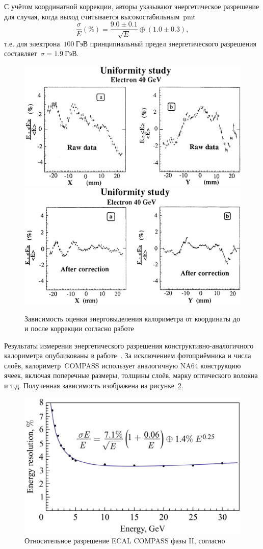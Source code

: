С учётом координатной коррекции, авторы указывают энергетическое
разрешение для случая, когда выход считывается
высокостабильным~\acrshort{pmt}
\begin{equation}
    \frac{\sigma}{E}(\%) = \frac{9.0 \pm 0.1}{\sqrt{E}} \oplus (1.0\pm0.3),
\end{equation}
т.е. для электрона~$100~\text{ГэВ}$ принципиальный предел энергетического
разрешения составляет~$\sigma =1.9~\text{ГэВ}$.

\begin{figure}
    \centering
    \includegraphics[width=0.48\linewidth]{images//illustrative/shashlyk-resolution-raw.png}
    \includegraphics[width=0.48\linewidth]{images//illustrative/shashlyk-resolution-corrected.png}
    \caption{Зависимость оценки энерговыделения калориметра от координаты до и после коррекции согласно работе~\cite{rd36-shashlik-1996}}
    \label{fig:shashlyk-correction-quote}
\end{figure}

Результаты измерения энергетического разрешения
конструктивно-аналогичного калориметра опубликованы
в работе~\cite{chirkovzorin-compass-ecal}. За исключением
фотоприёмника и числа слоёв,
калориметр~COMPASS использует аналогичную NA64 конструкцию
ячеек, включая поперечные размеры, толщины слоёв, марку оптического
волокна и т.д. Полученная зависимость изображена на
рисунке~\ref{fig:chirkovzorin-compass-ecal}.
\begin{figure}
    \centering
    \includegraphics[width=0.5\linewidth]{images//illustrative/compassII-ecal.png}
    \caption{Относительное разрешение ECAL COMPASS фазы II, согласно~\cite{chirkovzorin-compass-ecal}}
    \label{fig:chirkovzorin-compass-ecal}
\end{figure}

